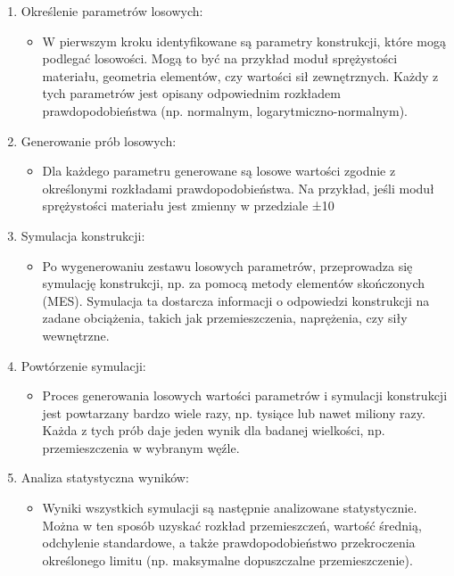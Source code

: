 \begin{enumerate}
\item Określenie parametrów losowych:

\begin{itemize}
\item W pierwszym kroku identyfikowane są parametry konstrukcji, które mogą podlegać losowości. Mogą to być na przykład moduł sprężystości materiału, geometria elementów, czy wartości sił zewnętrznych. Każdy z tych parametrów jest opisany odpowiednim rozkładem prawdopodobieństwa (np. normalnym, logarytmiczno-normalnym).
\end{itemize}

\item Generowanie prób losowych:

\begin{itemize}
\item Dla każdego parametru generowane są losowe wartości zgodnie z określonymi rozkładami prawdopodobieństwa. Na przykład, jeśli moduł sprężystości materiału jest zmienny w przedziale ±10%
\end{itemize}

\item Symulacja konstrukcji:

\begin{itemize}
\item Po wygenerowaniu zestawu losowych parametrów, przeprowadza się symulację konstrukcji, np. za pomocą metody elementów skończonych (MES). Symulacja ta dostarcza informacji o odpowiedzi konstrukcji na zadane obciążenia, takich jak przemieszczenia, naprężenia, czy siły wewnętrzne.
\end{itemize}

\item Powtórzenie symulacji:

\begin{itemize}
\item Proces generowania losowych wartości parametrów i symulacji konstrukcji jest powtarzany bardzo wiele razy, np. tysiące lub nawet miliony razy. Każda z tych prób daje jeden wynik dla badanej wielkości, np. przemieszczenia w wybranym węźle.
\end{itemize}

\item Analiza statystyczna wyników:

\begin{itemize}
\item Wyniki wszystkich symulacji są następnie analizowane statystycznie. Można w ten sposób uzyskać rozkład przemieszczeń, wartość średnią, odchylenie standardowe, a także prawdopodobieństwo przekroczenia określonego limitu (np. maksymalne dopuszczalne przemieszczenie).
\end{itemize}

\end{enumerate}
